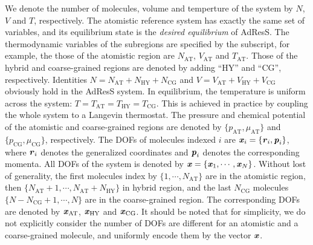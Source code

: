 \documentclass[epjST]{svjour}
\newcommand{\redc}[1]{{\color{red} #1}}
\newcommand{\vect}[1]{\textbf{\textit{#1}}}
\newcommand{\AT}[0]{\textrm{AT}}
\newcommand{\HY}[0]{\textrm{HY}}
\newcommand{\CG}[0]{\textrm{CG}}
\newcommand{\moleidxone}[0]{i}
\begin{document}
We denote the number of molecules, volume and temperture of the system by $N$, $V$ and $T$, respectively.
The atomistic reference system has exactly the same set of variables, and its equilibrium state  is
the \emph{desired equilibrium} of AdResS.
The thermodynamic variables of the subregions are specified by the subscript,
for example, the those of the atomistic region are 
$N_\AT$, $V_\AT$ and $T_\AT$. Those of the hybrid and coarse-grained regions
are denoted by adding ``$\HY$'' and ``$\CG$'', respectively.
Identities $N = N_\AT + N_\HY + N_\CG$ and $V = V_\AT + V_\HY + V_\CG$ obviously hold
in the AdResS system.
In equilibrium, the temperature is uniform across the system: $T = T_\AT = T_\HY = T_\CG$.
This is achieved in practice by coupling the whole system to a Langevin thermostat.
The pressure and chemical potential of the atomistic and coarse-grained regions
are denoted by $\{p_\AT, \mu_\AT\}$
and $\{p_\CG, \mu_\CG\}$, respectively.
The DOFs of molecules indexed $\moleidxone$ are $\vect x_\moleidxone = \{\vect r_\moleidxone, \vect p_\moleidxone\}$, where
$\vect r_\moleidxone$ denotes the generalized coordinates and $\vect p_\moleidxone$ denotes the corresponding momenta.
All DOFs of the system is denoted by $\vect x = \{\vect x_1, \cdots, \vect x_N\}$. Without lost of
generality, the first molecules index by $\{1, \cdots, N_\AT\}$ are in the atomistic region, then $\{N_\AT+1, \cdots, N_\AT + N_\HY\}$ in hybrid region, and
the last $N_\CG$ molecules $\{N-N_\CG+1, \cdots, N\}$ are in the coarse-grained region. The corresponding DOFs are denoted by $\vect x_\AT$, $\vect x_\HY$ and $\vect x_\CG$.
It should be noted that for simplicity, we do not explicitly consider the number of DOFs are different for an atomistic
and a coarse-grained molecule, and uniformly encode them by the vector $\vect x$.

\end{document}
